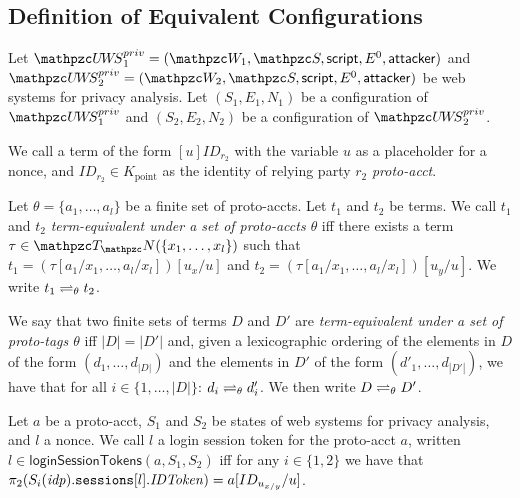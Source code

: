   \subsection{Definition of Equivalent Configurations}\label{app:rp:defin-equiv-stat}
  
  Let $\uppressoprivwebsystem_1 = (\bidsystem_1, \scriptset, \mathsf{script}, E^0, \fAP{attacker})$ 
  and $\uppressoprivwebsystem_2 = (\bidsystem_2, \scriptset, \mathsf{script}, E^0, \fAP{attacker})$ 
  be \uppresso web systems for privacy analysis. 
  Let $(S_1,E_1,N_1)$ be a configuration of $\uppressoprivwebsystem_1$ 
  and $(S_2,E_2,N_2)$ be a configuration of $\uppressoprivwebsystem_2$.
  
  \begin{definition}
    We call a term of the form $[u]ID_{r_2}$ with the variable
    $u$ as a placeholder for a nonce, and 
    $ID_{r_2}\in K_\text{point}$ as the identity of 
    relying party $r_2$ \emph{proto-acct}.
  \end{definition}
  
  \begin{definition}
    Let $\theta = \{a_1, \ldots, a_l \}$ be a finite set of proto-accts.
    Let $t_1$ and $t_2$ be terms. We call $t_1$ and $t_2$
    \emph{term-equivalent under a set of proto-accts $\theta$} 
    iff there exists a term $\tau \in \terms(\{x_1,\dots,x_l\})$ such that
    $t_1 = (\tau [ a_1 / x_1 , \dots , a_l / x_l ])[ u_x / u ]$ and
    $t_2 = (\tau [ a_1 / x_1 , \dots , a_l / x_l ])[ u_y / u ]$.
    We write $t_1 \rightleftharpoons_{\theta} t_2$.
  
    We say that two finite sets of terms $D$ and $D'$ are
    \emph{term-equivalent under a set of proto-tags $\theta$} 
    iff $|D| = |D'|$ and, given a lexicographic ordering of the 
    elements in $D$ of the form $(d_1,\dots,d_{|D|})$ and the 
    elements in $D'$ of the form $(d'_1,\dots,d_{|D'|})$, we 
    have that for all 
    $i \in \{1,\dots,|D|\}$: $d_i \rightleftharpoons_{\theta} d'_i$. 
    We then write $D \rightleftharpoons_{\theta} D'$.
  \end{definition}

  \begin{definition}
    Let $a$ be a proto-acct, $S_1$ and $S_2$ be states of \uppresso web systems for privacy analysis, and $l$ a nonce. 
    We call $l$ a login session token for the proto-acct $a$, written $l \in \mathsf{loginSessionTokens}(a,S_1,S_2)$ 
    iff for any $i \in \{1,2\}$ we have that $\pi_{2}({S_i(\mathit{idp}).\mathtt{sessions}[l].\mathit{IDToken}}) = a[ID_{u_{x/y}}/u]$.
  \end{definition}
  
